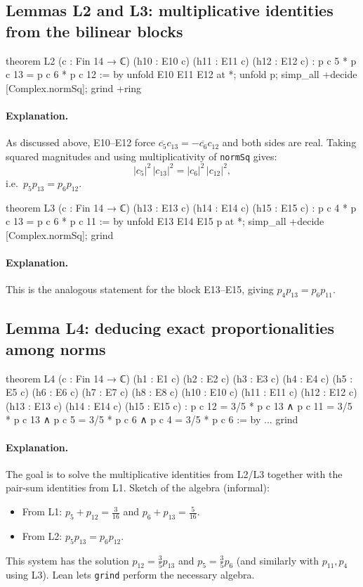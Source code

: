 \documentclass[11pt]{article}
\begin{document}
\subsection*{Lemmas L2 and L3: multiplicative identities from the bilinear blocks}

\begin{LeanCode}
theorem L2 (c : Fin 14 → ℂ)
  (h10 : E10 c) (h11 : E11 c) (h12 : E12 c) :
  p c 5 * p c 13 = p c 6 * p c 12 := by
  unfold E10 E11 E12 at *;
  unfold p;
  simp_all +decide [Complex.normSq];
  grind +ring
\end{LeanCode}

\paragraph{Explanation.}
As discussed above, E10--E12 force $\overline{c_5}c_{13}=-\overline{c_6}c_{12}$ and both sides are real.
Taking squared magnitudes and using multiplicativity of \texttt{normSq} gives:
\[
|c_5|^2\,|c_{13}|^2 = |c_6|^2\,|c_{12}|^2,
\]
i.e.\ $p_5p_{13}=p_6p_{12}$.

\begin{LeanCode}
theorem L3 (c : Fin 14 → ℂ)
  (h13 : E13 c) (h14 : E14 c) (h15 : E15 c) :
  p c 4 * p c 13 = p c 6 * p c 11 := by
  unfold E13 E14 E15 p at *;
  simp_all +decide [Complex.normSq];
  grind
\end{LeanCode}

\paragraph{Explanation.}
This is the analogous statement for the block E13--E15, giving $p_4p_{13}=p_6p_{11}$.

\subsection*{Lemma L4: deducing exact proportionalities among norms}

\begin{LeanCode}
theorem L4 (c : Fin 14 → ℂ)
  (h1 : E1 c) (h2 : E2 c) (h3 : E3 c) (h4 : E4 c)
  (h5 : E5 c) (h6 : E6 c) (h7 : E7 c) (h8 : E8 c)
  (h10 : E10 c) (h11 : E11 c) (h12 : E12 c)
  (h13 : E13 c) (h14 : E14 c) (h15 : E15 c) :
  p c 12 = 3/5 * p c 13 ∧
  p c 11 = 3/5 * p c 13 ∧
  p c 5 = 3/5 * p c 6 ∧
  p c 4 = 3/5 * p c 6 := by
  ...
  grind
\end{LeanCode}

\paragraph{Explanation.}
The goal is to solve the multiplicative identities from L2/L3 together with the pair-sum identities from L1.
Sketch of the algebra (informal):
\begin{itemize}
\item From L1: $p_5+p_{12}=\frac{3}{16}$ and $p_6+p_{13}=\frac{5}{16}$.
\item From L2: $p_5p_{13}=p_6p_{12}$.
\end{itemize}
This system has the solution $p_{12}=\frac35 p_{13}$ and $p_5=\frac35 p_6$ (and similarly with $p_{11},p_4$ using L3).
Lean lets \texttt{grind} perform the necessary algebra.
\end{document}
